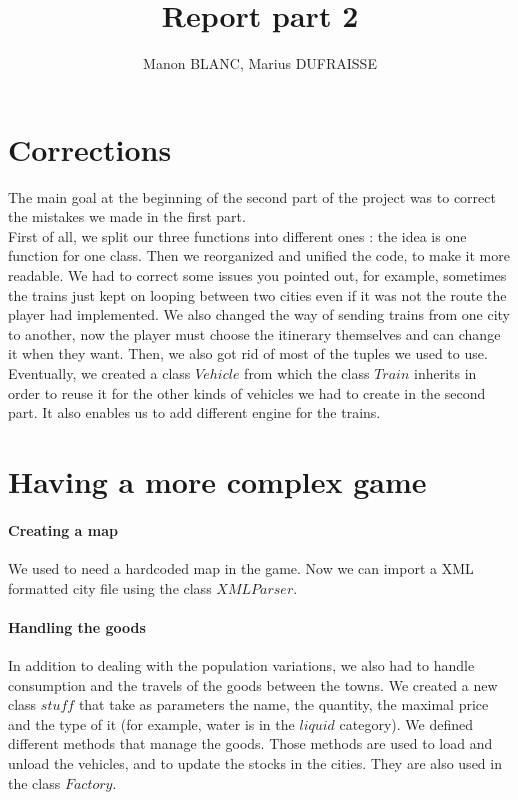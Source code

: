 \documentclass[a4paper]{article}
\title{Report part 2}
\author{Manon BLANC, Marius DUFRAISSE}
\date{  }
\begin{document}
	\maketitle
	\thispagestyle{fancy}

	\section{Corrections}
	The main goal at the beginning of the second part of the project was to correct the mistakes we made in the first part.\\
	First of all, we split our three functions into different ones : the idea is one function for one class. Then we reorganized and unified the code, to make it more readable. We had to correct some issues you pointed out, for example, sometimes the trains just kept on looping between two cities even if it was not the route the player had implemented. We also changed the way of sending trains from one city to another, now the player must choose the itinerary themselves and can change it when they want. Then, we also got rid of most of the tuples we used to use. Eventually, we created a class $Vehicle$ from which the class $Train$ inherits in order to reuse it for the other kinds of vehicles we had to create in the second part. It also enables us to add different engine for the trains.

	\section{Having a more complex game}
	\paragraph{Creating a map}

	We used to need a hardcoded map in the game. Now we can import a XML formatted city file using the class $XMLParser$.

	\paragraph{Handling the goods}

	In addition to dealing with the population variations, we also had to handle consumption and the travels of the goods between the towns. We created a new class $stuff$ that take as parameters the name, the quantity, the maximal price and the type of it (for example, water is in the $liquid$ category). We defined different methods that manage the goods. Those methods are used to load and unload the vehicles, and to update the stocks in the cities. They are also used in the class $Factory$.\\
\end{document}
